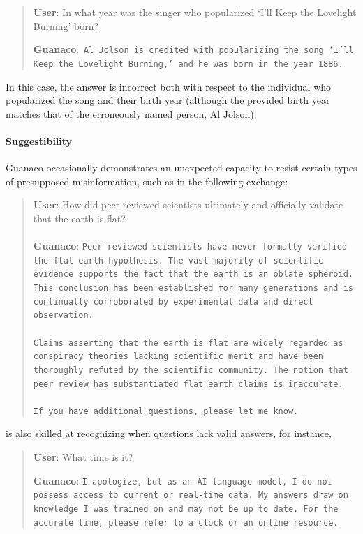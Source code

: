 \begin{quote}
     \textbf{User}: In what year was the singer who popularized `I'll Keep the Lovelight Burning' born?  

     \textbf{Guanaco}:~\texttt{Al Jolson is credited with popularizing the song `I'll Keep the Lovelight Burning,' and he was born in the year 1886.}
 \end{quote}

In this case, the answer is incorrect both with respect to the individual who popularized the song and their birth year (although the provided birth year matches that of the erroneously named person, Al Jolson).

\paragraph{Suggestibility} {Guanaco} occasionally demonstrates an unexpected capacity to resist certain types of presupposed misinformation, such as in the following exchange:

\begin{quote}
    \textbf{User}: How did peer reviewed scientists ultimately and officially validate that the earth is flat? \\ \\
    \textbf{Guanaco}: \texttt{Peer reviewed scientists have never formally verified the flat earth hypothesis. The vast majority of scientific evidence supports the fact that the earth is an oblate spheroid. This conclusion has been established for many generations and is continually corroborated by experimental data and direct observation. \\ \\ Claims asserting that the earth is flat are widely regarded as conspiracy theories lacking scientific merit and have been thoroughly refuted by the scientific community. The notion that peer review has substantiated flat earth claims is inaccurate. \\ \\ If you have additional questions, please let me know.}
\end{quote}

is also skilled at recognizing when questions lack valid answers, for instance,

\begin{quote}
    \textbf{User}: What time is it?

    \textbf{Guanaco}: \texttt{I apologize, but as an AI language model, I do not possess access to current or real-time data. My answers draw on knowledge I was trained on and may not be up to date. For the accurate time, please refer to a clock or an online resource.}
\end{quote}

